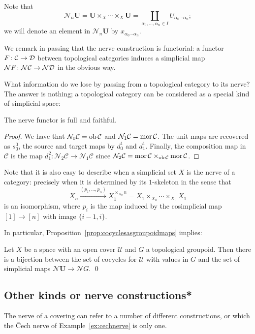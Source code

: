 \documentclass[a4paper,openany]{scrbook}
\renewcommand{\C}{\mathcal C}
\newcommand{\nerve}{\mathcal N}
\begin{document}
Note that
\[
\nerve_n\mathbf U = \mathbf U \times_X \cdots \times_X \mathbf U = \coprod_{\alpha_0,\dots,\alpha_n \in I} U_{\alpha_0\cdots\alpha_n};
\]
we will denote an element in $\nerve_n\mathbf U$ by $x_{\alpha_0\cdots\alpha_n}$.

We remark in passing that the nerve construction is functorial: a functor $F\colon \C \to \D$ between topological categories induces a simplicial map $\nerve F\colon \nerve\C \to \nerve\D$ in the obvious way. 

What information do we lose by passing from a topological category to its nerve? The answer is nothing; a topological category can be considered as a special kind of simplicial space:

\begin{prop}\label{prop:nervefullyfaithful}
The nerve functor is full and faithful. 
\end{prop}
\begin{proof}
We have that $\nerve_0\C = \ob\C$ and $\nerve_1\C = \mor\C$. The unit maps are recovered as $s^0_0$, the source and target maps by $d^1_0$ and $d^1_1$. Finally, the composition map in $\C$ is the map $d^2_1\colon \nerve_2\C \to \nerve_1\C$ since $\nerve_2\C = \mor\C \times_{\ob\C} \mor\C$.
\end{proof}

Note that it is also easy to describe when a simplicial set $X$ is the nerve of a category: precisely when it is determined by its $1$-skeleton in the sense that
\[
X_n \xrightarrow{(p_1,\dots,p_n)} X_1^{\times_{X_0} n} = X_1 \times_{X_0} \cdots \times_{X_0} X_1
\]
is an isomorphism, where $p_i$ is the map induced by the cosimplicial map $[1] \to [n]$ with image $\{i-1,i\}$.

In particular, Proposition~\ref{prop:cocyclesasgroupoidmaps} implies:

\begin{corollary}
Let $X$ be a space with an open cover $\mathcal U$ and $G$ a topological groupoid. Then there is a bijection between the set of cocycles for $\mathcal U$ with values in $G$ and the set of simplicial maps $\nerve \mathbf U \to \nerve G$. \qed
\end{corollary}

\subsection{Other kinds or nerve constructions*}

The nerve of a covering can refer to a number of different constructions, or which the \v Cech nerve of Example~\ref{ex:cechnerve} is only one.
\end{document}
